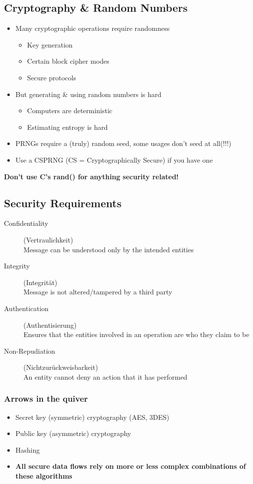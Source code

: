 \subsection{Cryptography \& Random Numbers}
\begin{itemize}
  \item Many cryptographic operations require randomness
  \begin{itemize}
    \item Key generation
    \item Certain block cipher modes
    \item Secure protocols
  \end{itemize}
  \item But generating \& using random numbers is hard
  \begin{itemize}
    \item Computers are deterministic
    \item Estimating entropy is hard
  \end{itemize}
  \item PRNGs require a (truly) random seed, some usages don't seed at all(!!!)
  \item Use a CSPRNG (CS = Cryptographically Secure) if you have one
\end{itemize}
\textbf{Don't use C's rand() for anything security related!}

\subsection{Security Requirements}
\begin{description}
  \item[Confidentiality] (Vertraulichkeit)\\ Message can be understood only by the intended entities
  \item[Integrity] (Integrität)\\ Message is not altered/tampered by a third party
  \item[Authentication] (Authentisierung)\\ Ensures that the entities involved in an operation are who they claim to be
  \item[Non-Repudiation] (Nichtzurückweisbarkeit)\\ An entity cannot deny an action that it has performed
\end{description}

\subsubsection{Arrows in the quiver}
\begin{itemize}
  \item Secret key (symmetric) cryptography (AES, 3DES)
  \item Public key (asymmetric) cryptography
  \item Hashing
  \item \textbf{All secure data flows rely on more or less complex combinations of these algorithms}
\end{itemize}

